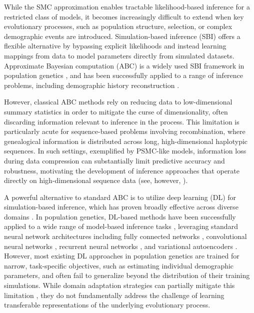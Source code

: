 \documentclass[9pt,twocolumn,twoside]{pnas-new}
\begin{document}
While the SMC approximation enables tractable likelihood-based inference for a restricted class of models, 
it becomes increasingly difficult to extend when key evolutionary processes, such as population structure, selection, or complex demographic events are introduced. 
Simulation-based inference (SBI) offers a flexible alternative by bypassing explicit likelihoods 
and instead learning mappings from data to model parameters directly from simulated datasets.
Approximate Bayesian computation (ABC) is  a widely used SBI framework in population genetics \cite{beaumont_approximate_2002}, and has been successfully applied to a range of inference problems, including demographic history reconstruction \cite{boitard_inferring_2016, jay_abc_2019}. 

However, classical ABC methods rely on reducing data to low-dimensional summary statistics 
in order to mitigate the curse of dimensionality, 
often discarding information relevant to inference in the process. 
This limitation is particularly acute for sequence-based problems involving recombination, 
where genealogical information is distributed across long, high-dimensional haplotypic sequences. 
In such settings, exemplified by PSMC-like models, information loss during data compression can substantially limit
predictive accuracy and robustness, 
motivating the development of inference approaches that operate directly on high-dimensional sequence data (see, 
however, \cite{min2025neural}).

A powerful alternative to standard ABC is to utilize deep learning (DL) for simulation-based inference, which has
proven broadly effective across diverse domains \cite{schmidhuber_annotated_2022}. 
In population genetics, DL-based methods have been successfully applied to a wide range of model-based inference tasks \cite{korfmann_deep_2023}, 
leveraging standard neural network architectures including fully connected networks \cite{sheehan2016deep,battey_predicting_2020},
convolutional neural networks \cite{kern2018diplos, flagel_unreasonable_2019, torada_imagene_2019, sanchez_deep_2021, whitehouse2023timesweeper, smith2023dispersal, smith2023dispersenn2, nait_saada_inference_2023}, recurrent neural networks \cite{adrion2020predicting}, and
variational autoencoders \cite{battey2021visualizing}. 
However, most existing DL approaches in population genetics are trained for narrow, task-specific objectives,
such as estimating individual demographic parameters,
and often fail to generalize beyond the distribution of their training simulations. 
While domain adaptation strategies can partially mitigate this limitation \cite{mo2023domain}, 
they do not fundamentally address the challenge of learning transferable representations of the underlying evolutionary process.
\end{document}
